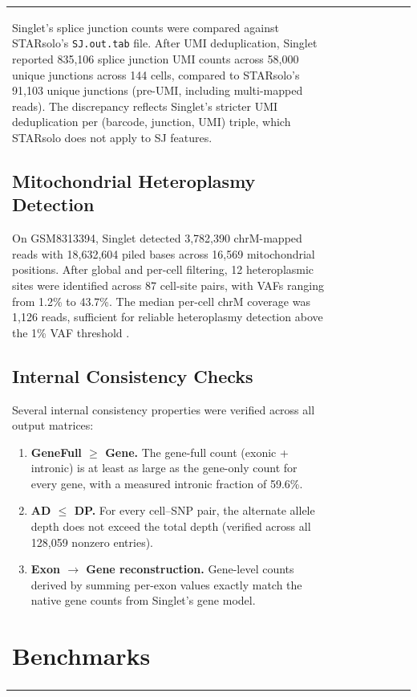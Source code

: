 \documentclass[11pt,a4paper]{article}
\begin{document}
\begin{table}[t]
\begin{tabular}{llllrrrr}
{Singlet's splice junction counts were compared against STARsolo's \texttt{SJ.out.tab} file. After UMI deduplication, Singlet reported 835,106 splice junction UMI counts across 58,000 unique junctions across 144 cells, compared to STARsolo's 91,103 unique junctions (pre-UMI, including multi-mapped reads). The discrepancy reflects Singlet's stricter UMI deduplication per (barcode, junction, UMI) triple, which STARsolo does not apply to SJ features.

\subsection{Mitochondrial Heteroplasmy Detection}

On GSM8313394, Singlet detected 3,782,390 chrM-mapped reads with 18,632,604 piled bases across 16,569 mitochondrial positions. After global and per-cell filtering, 12 heteroplasmic sites were identified across 87 cell-site pairs, with VAFs ranging from 1.2\% to 43.7\%. The median per-cell chrM coverage was 1,126 reads, sufficient for reliable heteroplasmy detection above the 1\% VAF threshold \citep{lareau2021mgatk}.

\subsection{Internal Consistency Checks}

Several internal consistency properties were verified across all output matrices:

\begin{enumerate}
    \item \textbf{GeneFull $\geq$ Gene.} The gene-full count (exonic + intronic) is at least as large as the gene-only count for every gene, with a measured intronic fraction of 59.6\%.
    \item \textbf{AD $\leq$ DP.} For every cell--SNP pair, the alternate allele depth does not exceed the total depth (verified across all 128,059 nonzero entries).
    \item \textbf{Exon $\rightarrow$ Gene reconstruction.} Gene-level counts derived by summing per-exon values exactly match the native gene counts from Singlet's gene model.
\end{enumerate}

\section{Benchmarks}\label{sec:benchmarks}

}
\end{tabular}
\end{table}
\end{document}
